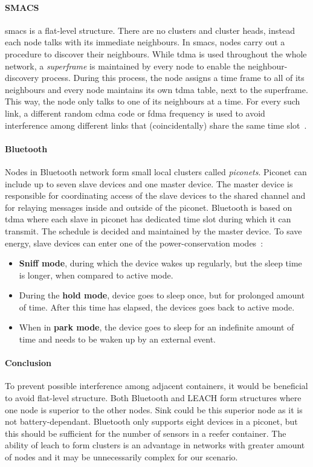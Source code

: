 \paragraph{SMACS}
\acrshort{smacs} is a flat-level structure. There are no clusters and cluster heads, instead each node talks with its immediate neighbours. In \acrlong{smacs}, nodes carry out a procedure to discover their neighbours. While \acrshort{tdma} is used throughout the whole network, a \textit{superframe} is maintained by every node to enable the neighbour-discovery process. During this process, the node assigns a time frame to all of its neighbours and every node maintains its own \acrshort{tdma} table, next to the superframe. This way, the node only talks to one of its neighbours at a time. For every such link, a different random \acrshort{cdma} code or \acrshort{fdma} frequency is used to avoid interference among different links that (coincidentally) share the same time slot~\cite{Sohraby2007WirelessApplications, Sohrabi2000ProtocolsNetwork}.

\paragraph{Bluetooth}
Nodes in Bluetooth network form small local clusters called \textit{piconets}. Piconet can include up to seven slave devices and one master device. The master device is responsible for coordinating access of the slave devices to the shared channel and for relaying messages inside and outside of the piconet. Bluetooth is based on \acrshort{tdma} where each slave in piconet has dedicated time slot during which it can transmit. The schedule is decided and maintained by the master device. To save energy, slave devices can enter one of the power-conservation modes~\cite{Haartsen2000TheSystem, Sohraby2007WirelessApplications}:
\begin{itemize}[noitemsep]
    \item \textbf{Sniff mode}, during which the device wakes up regularly, but the sleep time is longer, when compared to active mode.
    \item During the \textbf{hold mode}, device goes to sleep once, but for prolonged amount of time. After this time has elapsed, the devices goes back to active mode.
    \item When in \textbf{park mode}, the device goes to sleep for an indefinite amount of time and needs to be waken up by an external event.
\end{itemize}

\paragraph{Conclusion}
To prevent possible interference among adjacent containers, it would be beneficial to avoid flat-level structure. Both Bluetooth and LEACH form structures where one node is superior to the other nodes. Sink could be this superior node as it is not battery-dependant. Bluetooth only supports eight devices in a piconet, but this should be sufficient for the number of sensors in a reefer container. The ability of \acrshort{leach} to form clusters is an advantage in networks with greater amount of nodes and it may be unnecessarily complex for our scenario.
